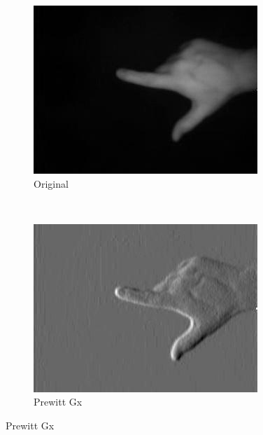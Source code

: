 \begin{figure}
    \centering
    \begin{subfigure}[b]{0.3\textwidth}
        \includegraphics[width=\textwidth]{image/gradiente_original.jpg}
        \caption{Original}
        \label{fig:gradiente_original}
    \end{subfigure}%
    ~ %
    \begin{subfigure}[b]{0.3\textwidth}
        \includegraphics[width=\textwidth]{image/gradiente_prewitt_gx.jpg}
        \caption{Prewitt Gx}
        \label{fig:gradiente_gx}
    \end{subfigure}

\end{figure}
